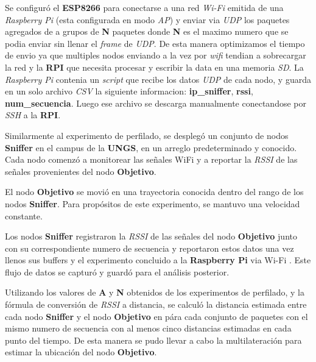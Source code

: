 Se configuró el \textbf{ESP8266} para conectarse a una red \textit{Wi-Fi} emitida de una \textit{Raspberry Pi} (esta configurada en modo \textit{AP}) y enviar via \textit{UDP} los paquetes agregados de a grupos de \textbf{N} paquetes donde \textbf{N} es el maximo numero que se podia enviar sin llenar el \textit{frame} de \textit{UDP}. De esta manera optimizamos el tiempo de envio ya que multiples nodos enviando a la vez por \textit{wifi} tendian a sobrecargar la red y la \textbf{RPI} que necesita procesar y escribir la data en una memoria \textit{SD}.
La \textit{Raspberry Pi} contenia un \textit{script} que recibe los datos \textit{UDP} de cada nodo, y guarda en un solo archivo \textit{CSV} la siguiente informacion: \textbf{ip\_sniffer}, \textbf{rssi}, \textbf{num\_secuencia}. Luego ese archivo se descarga manualmente conectandose por \textit{SSH} a la \textbf{RPI}. 

Similarmente al experimento de perfilado, se desplegó un conjunto de nodos \textbf{Sniffer} en el campus de la \textbf{UNGS}, en un arreglo predeterminado y conocido. Cada nodo comenzó a monitorear las señales WiFi y a reportar la \textit{RSSI} de las señales provenientes del nodo \textbf{Objetivo}.

El nodo \textbf{Objetivo} se movió en una trayectoria conocida dentro del rango de los nodos \textbf{Sniffer}. Para propósitos de este experimento, se mantuvo una velocidad constante.

Los nodos \textbf{Sniffer} registraron la \textit{RSSI} de las señales del nodo \textbf{Objetivo} junto con su correspondiente numero de secuencia y reportaron estos datos una vez llenos sus buffers y el experimento concluido a la \textbf{Raspberry Pi} via Wi-Fi . Este flujo de datos se capturó y guardó para el análisis posterior.

Utilizando los valores de \textbf{A} y \textbf{N} obtenidos de los experimentos de perfilado, y la fórmula de conversión de \textit{RSSI} a distancia, se calculó la distancia estimada entre cada nodo \textbf{Sniffer} y el nodo \textbf{Objetivo} en pára cada conjunto de paquetes con el mismo numero de secuencia con al menos cinco distancias estimadas en cada punto del tiempo. De esta manera se pudo llevar a cabo la multilateración para estimar la ubicación del nodo \textbf{Objetivo}.

